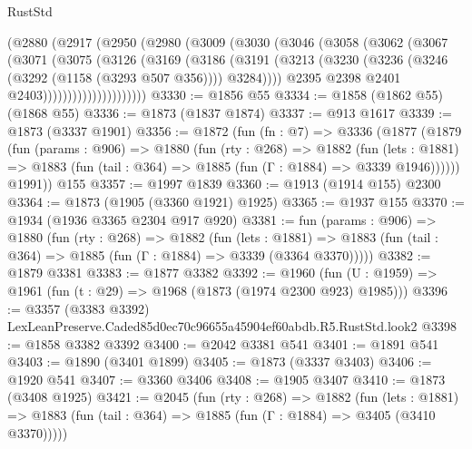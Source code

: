 \begin{lexlean}{RustStd}
\begin{coremodule}
                (@2880
                  (@2917
                    (@2950
                      (@2980
                        (@3009
                          (@3030
                            (@3046
                              (@3058
                                (@3062
                                  (@3067
                                    (@3071
                                      (@3075
                                        (@3126
                                          (@3169
                                            (@3186
                                              (@3191
                                                (@3213
                                                  (@3230
                                                    (@3236
                                                      (@3246 (@3292 (@1158 (@3293 @507 @356))))
                                                      @3284))))
                                              @2395
                                              @2398
                                              @2401
                                              @2403)))))))))))))))))))))
@3330 := @1856 @55
@3334 := @1858 (@1862 @55) (@1868 @55)
@3336 := @1873 (@1837 @1874)
@3337 := @913 @1617
@3339 := @1873 (@3337 @1901)
@3356 := @1872
    (fun (fn : @7) =>
    @3336
      (@1877
        (@1879
          (fun (params : @906) =>
          @1880
            (fun (rty : @268) =>
            @1882
              (fun (lets : @1881) =>
              @1883 (fun (tail : @364) => @1885 (fun (Γ : @1884) => @3339 @1946))))))
        @1991))
    @155
@3357 := @1997 @1839
@3360 := @1913 (@1914 @155) @2300
@3364 := @1873 (@1905 (@3360 @1921) @1925)
@3365 := @1937 @155
@3370 := @1934 (@1936 @3365 @2304 @917 @920)
@3381 := fun (params : @906) =>
  @1880
    (fun (rty : @268) =>
    @1882
      (fun (lets : @1881) =>
      @1883 (fun (tail : @364) => @1885 (fun (Γ : @1884) => @3339 (@3364 @3370)))))
@3382 := @1879 @3381
@3383 := @1877 @3382
@3392 := @1960 (fun (U : @1959) => @1961 (fun (t : @29) => @1968 (@1873 (@1974 @2300 @923) @1985)))
@3396 := @3357 (@3383 @3392) LexLeanPreserve.Caded85d0ec70c96655a45904ef60abdb.R5.RustStd.look2
@3398 := @1858 @3382 @3392
@3400 := @2042 @3381 @541
@3401 := @1891 @541
@3403 := @1890 (@3401 @1899)
@3405 := @1873 (@3337 @3403)
@3406 := @1920 @541
@3407 := @3360 @3406
@3408 := @1905 @3407
@3410 := @1873 (@3408 @1925)
@3421 := @2045
    (fun (rty : @268) =>
    @1882
      (fun (lets : @1881) =>
      @1883 (fun (tail : @364) => @1885 (fun (Γ : @1884) => @3405 (@3410 @3370)))))

\end{coremodule}
\end{lexlean}

